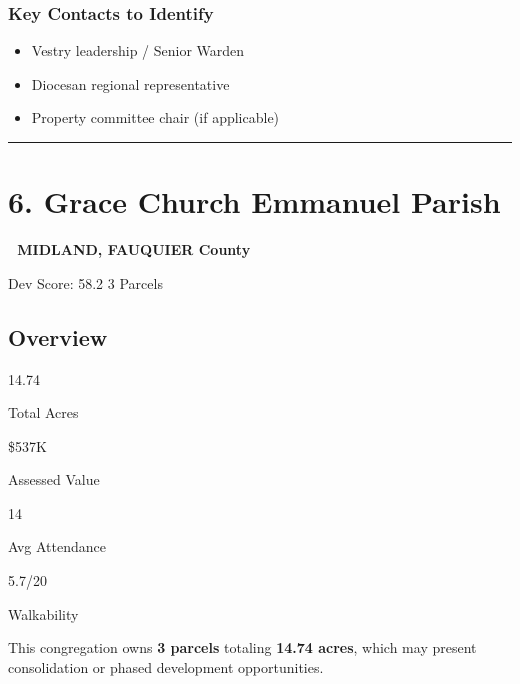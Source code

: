 \documentclass[
  letterpaper,
  DIV=11,
  numbers=noendperiod,
  oneside]{scrreprt}
\providecommand{\tightlist}{%
  \setlength{\itemsep}{0pt}\setlength{\parskip}{0pt}}
\begin{document}
\subsubsection{Key Contacts to
Identify}\label{key-contacts-to-identify-4}

\begin{itemize}
\tightlist
\item[$\square$]
  Vestry leadership / Senior Warden
\item[$\square$]
  Diocesan regional representative
\item[$\square$]
  Property committee chair (if applicable)
\end{itemize}

\begin{center}\rule{0.5\linewidth}{0.5pt}\end{center}

\section*{6. Grace Church Emmanuel
Parish}\label{grace-church-emmanuel-parish}


\textbf{📍 MIDLAND, FAUQUIER County}

{Dev Score: 58.2} {3 Parcels}

\subsection{Overview}

{14.74}

{Total Acres}

{\$537K}

{Assessed Value}

{14}

{Avg Attendance}

{5.7/20}

{Walkability}

\begin{tcolorbox}[enhanced jigsaw, bottomtitle=1mm, left=2mm, rightrule=.15mm, colbacktitle=quarto-callout-tip-color!10!white, arc=.35mm, title=\textcolor{quarto-callout-tip-color}{\faLightbulb}\hspace{0.5em}{📋 Multi-Parcel Opportunity}, bottomrule=.15mm, colback=white, colframe=quarto-callout-tip-color-frame, leftrule=.75mm, titlerule=0mm, opacitybacktitle=0.6, breakable, coltitle=black, toptitle=1mm, toprule=.15mm, opacityback=0]

This congregation owns \textbf{3 parcels} totaling \textbf{14.74 acres},
which may present consolidation or phased development opportunities.

\end{tcolorbox}
\end{document}

